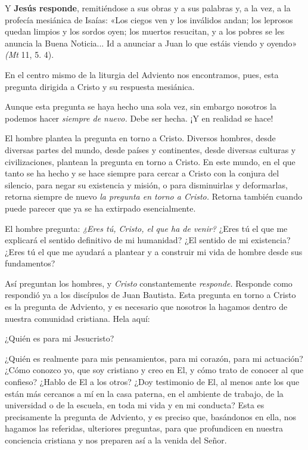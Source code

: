 \documentclass[]{article}
\begin{document}
Y \textbf{Jesús responde}, remitiéndose a sus obras y a sus palabras y,
a la vez, a la profecía mesiánica de Isaías: «Los ciegos ven y los
inválidos andan; los leprosos quedan limpios y los sordos oyen; los
muertos resucitan, y a los pobres se les anuncia la Buena Noticia... Id
a anunciar a Juan lo que estáis viendo y oyendo» \emph{(Mt} 11, 5. 4).

En el centro mismo de la liturgia del Adviento nos encontramos, pues,
esta pregunta dirigida a Cristo y su respuesta mesiánica.

Aunque esta pregunta se haya hecho una sola vez, sin embargo nosotros la
podemos hacer \emph{siempre de nuevo.} Debe ser hecha. ¡Y en realidad se
hace!

El hombre plantea la pregunta en torno a Cristo. Diversos hombres, desde
diversas partes del mundo, desde países y continentes, desde diversas
culturas y civilizaciones, plantean la pregunta en torno a Cristo. En
este mundo, en el que tanto se ha hecho y se hace siempre para cercar a
Cristo con la conjura del silencio, para negar su existencia y misión, o
para disminuirlas y deformarlas, retorna siempre de nuevo \emph{la
pregunta en torno a Cristo.} Retorna también cuando puede parecer que ya
se ha extirpado esencialmente.

El hombre pregunta: \emph{¿Eres tú, Cristo, el que ha de venir?} ¿Eres
tú el que me explicará el sentido definitivo de mi humanidad? ¿El
sentido de mi existencia? ¿Eres tú el que me ayudará a plantear y a
construir mi vida de hombre desde sus fundamentos?

Así preguntan los hombres, y \emph{Cristo} constantemente
\emph{responde.} Responde como respondió ya a los discípulos de Juan
Bautista. Esta pregunta en torno a Cristo es la pregunta de Adviento, y
es necesario que nosotros la hagamos dentro de nuestra comunidad
cristiana. Hela aquí:

¿Quién es para mi Jesucristo?

¿Quién es realmente para mis pensamientos, para mi corazón, para mi
actuación? ¿Cómo conozco yo, que soy cristiano y creo en El, y cómo
trato de conocer al que confieso? ¿Hablo de El a los otros? ¿Doy
testimonio de El, al menos ante los que están más cercanos a mí en la
casa paterna, en el ambiente de trabajo, de la universidad o de la
escuela, en toda mi vida y en mi conducta? Esta es precisamente la
pregunta de Adviento, y es preciso que, basándonos en ella, nos hagamos
las referidas, ulteriores preguntas, para que profundicen en nuestra
conciencia cristiana y nos preparen así a la venida del Señor.
\end{document}
